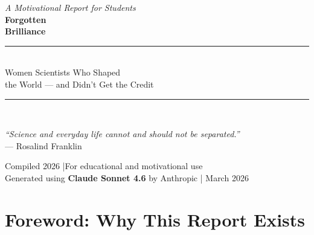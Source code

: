 \documentclass[12pt,a4paper]{article}
\begin{document}
\begin{titlepage}
\pagecolor{deepplum}
\color{white}
\vspace*{2cm}
\begin{center}
{\fontsize{12}{16}\selectfont\color{goldhigh}\textit{A Motivational Report for Students}}\\[1.5cm]

{\fontsize{32}{40}\selectfont\bfseries Forgotten}\\[0.3cm]
{\fontsize{32}{40}\selectfont\bfseries Brilliance}\\[1.2cm]

{\color{medgray}\rule{12cm}{0.4pt}}\\[1cm]

{\fontsize{14}{20}\selectfont Women Scientists Who Shaped\\[0.4cm]
the World --- and Didn't Get the Credit}\\[1.5cm]

{\color{medgray}\rule{12cm}{0.4pt}}\\[2cm]

\begin{minipage}{0.75\textwidth}
\centering
{\large\itshape ``Science and everyday life cannot and should not be separated.''}\\[0.5cm]
{\normalsize\color{goldhigh} --- Rosalind Franklin}
\end{minipage}

\vfill
{\small\color{medgray} Compiled 2026 \quad|\quad For educational and motivational use}\\[6pt]
{\small\color{softplum!70} Generated using \textbf{Claude Sonnet 4.6} by Anthropic \quad| March 2026}
\end{center}
\end{titlepage}
\nopagecolor

\newpage
\setcounter{page}{1}
{\hypersetup{linkcolor=deepplum}
\tableofcontents}
\newpage

\section*{Foreword: Why This Report Exists}
\vspace{-4pt}
\end{document}
